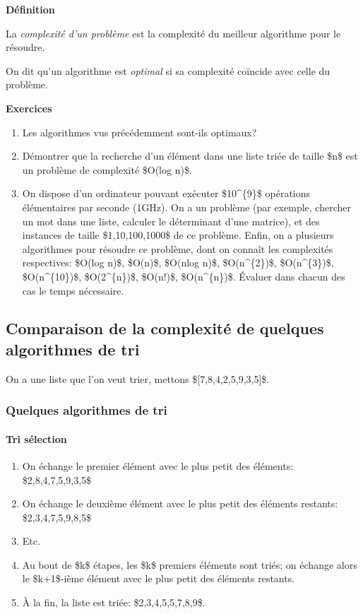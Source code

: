 \textbf{Définition}

La \emph{complexité d'un problème} est la complexité du meilleur
algorithme pour le résoudre.

On dit qu'un algorithme est \emph{optimal} si sa complexité coïncide
avec celle du problème.

\textbf{Exercices}

\begin{enumerate}
\item
  Les algorithmes vus précédemment sont-ils optimaux?
\item
  Démontrer que la recherche d'un élément dans une liste triée de taille
  \$n\$ est un problème de complexité \$O(log n)\$.
\item
  On dispose d'un ordinateur pouvant exécuter \$10\^{}\{9\}\$ opérations
  élémentaires par seconde (1GHz). On a un problème (par exemple,
  chercher un mot dans une liste, calculer le déterminant d'une
  matrice), et des instances de taille \$1,10,100,1000\$ de ce problème.
  Enfin, on a plusieurs algorithmes pour résoudre ce problème, dont on
  connaît les complexités respectives: \$O(log n)\$, \$O(n)\$, \$O(nlog
  n)\$, \$O(n\^{}\{2\})\$, \$O(n\^{}\{3\})\$, \$O(n\^{}\{10\})\$,
  \$O(2\^{}\{n\})\$, \$O(n!)\$, \$O(n\^{}\{n\})\$. Évaluer dans chacun
  des cas le temps nécessaire.
\end{enumerate}

\subsection{Comparaison de la complexité de quelques algorithmes de tri}

On a une liste que l'on veut trier, mettons \${[}7,8,4,2,5,9,3,5{]}\$.

\subsubsection{Quelques algorithmes de tri}

\paragraph{Tri sélection}

\begin{enumerate}
\item
  On échange le premier élément avec le plus petit des éléments:
  \$2,8,4,7,5,9,3,5\$
\item
  On échange le deuxième élément avec le plus petit des éléments
  restants: \$2,3,4,7,5,9,8,5\$
\item
  Etc.
\item
  Au bout de \$k\$ étapes, les \$k\$ premiers éléments sont triés; on
  échange alors le \$k+1\$-ième élément avec le plus petit des éléments
  restants.
\item
  À la fin, la liste est triée: \$2,3,4,5,5,7,8,9\$.
\end{enumerate}

